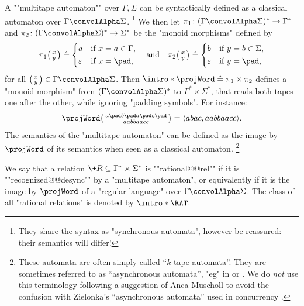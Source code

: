 A \AP""multitape automaton"" over $\Gamma,\Sigma$
can be syntactically defined as a classical automaton over $\Gamma \convolAlpha \Sigma$.%
\footnote{They share the syntax as "synchronous automata", however be reassured: their semantics will differ!}
We then let $\pi_1\colon (\Gamma\convolAlpha\Sigma)^* \to \Gamma^*$ and 
$\pi_2\colon (\Gamma\convolAlpha\Sigma)^* \to \Sigma^*$ be the "monoid morphisms"
defined by
\[
	\pi_1\pair{x}{y}\defeq \begin{cases*}
		a & \text{if $x = a \in \Gamma$,}\\
		\varepsilon & \text{if $x=\pad$,}
	\end{cases*}
	\quad\text{and}\quad
	\pi_2\pair{x}{y}\defeq \begin{cases*}
		b & \text{if $y = b \in \Sigma$,}\\
		\varepsilon & \text{if $y=\pad$,}
	\end{cases*}
\]
for all $\pair{x}{y}\in \Gamma\convolAlpha\Sigma$.
Then \AP$\intro*\projWord \defeq \pi_1 \times \pi_2$ defines a "monoid morphism" 
from $(\Gamma\convolAlpha\Sigma)^*$ to $\Gamma^* \times \Sigma^*$,
that reads both tapes one after the other, while ignoring "padding symbols".
For instance:
\[
	\projWord\pair{a \pad b \pad a \pad c \pad}{a a b b a a c c}
	= \tup{abac, aabbaacc}.
\]
The semantics of the "multitape automaton"
can be defined as the image by $\projWord$ of its semantics when seen as a
classical automaton.%
\footnote[][-15em]{These automata are often simply called ``$k$-tape automata''. 
They are sometimes referred to as ``asynchronous automata'',
"eg" in \cite[\S~3]{CarayolLoding2011Uniformization} or
\cite[\S~3.1.2.2, p.~88]{Pelecq1997Isomorphismes}.
We do \emph{not} use this terminology following a suggestion
of Anca Muscholl to avoid the confusion with Zielonka's ``asynchronous automata'' used in 
concurrency \cite[\S~4]{Zielonka1987AsynchronousAutomata}.}

We say that a relation $\+R \subseteq \Gamma^* \times \Sigma^*$ is ""rational@@rel""
if it is \AP""recognized@@desync"" by a "multitape automaton",
or equivalently if it is the image by $\projWord$ of a "regular language"
over $\Gamma\convolAlpha\Sigma$.
The class of all "rational relations" is denoted by \AP$\intro*\RAT$.

